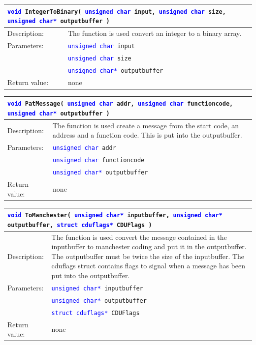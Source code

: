 \begin{table}[H]
\begin{tabular}{l p{12.5cm}}
\multicolumn{2}{p{15cm}}{\texttt{\textcolor{blue}{void} IntegerToBinary( \texttt{\textcolor{blue}{unsigned char} input, \textcolor{blue}{unsigned char} size, \textcolor{blue}{unsigned char*} outputbuffer  }) } } \\
\hline
Description:& The function is used convert an integer to a binary array.\\
Parameters:&\texttt{\textcolor{blue}{unsigned char} input}\\
&\texttt{\textcolor{blue}{unsigned char} size}\\
&\texttt{\textcolor{blue}{unsigned char*} outputbuffer}\\
Return value:&none\\
\end{tabular}
\end{table}

\begin{table}[H]
\begin{tabular}{l p{12.5cm}}
\multicolumn{2}{p{15cm}}{\texttt{\textcolor{blue}{void} PatMessage( \texttt{\textcolor{blue}{unsigned char} addr, \textcolor{blue}{unsigned char} functioncode, \textcolor{blue}{unsigned char*} outputbuffer  }) } } \\
\hline
Description:& The function is used create a message from the start code, an address and a function code. This is put into the outputbuffer.\\
Parameters:&\texttt{\textcolor{blue}{unsigned char} addr}\\
&\texttt{\textcolor{blue}{unsigned char} functioncode}\\
&\texttt{\textcolor{blue}{unsigned char*} outputbuffer}\\
Return value:&none\\
\end{tabular}
\end{table}

\begin{table}[H]
\begin{tabular}{l p{12.5cm}}
\multicolumn{2}{p{15cm}}{\texttt{\textcolor{blue}{void} ToManchester( \texttt{\textcolor{blue}{unsigned char*} inputbuffer, \textcolor{blue}{unsigned char*} outputbuffer, \textcolor{blue}{struct cduflags*} CDUFlags  }) } } \\
\hline
Description:& The function is used convert the message contained in the inputbuffer to manchester coding and put it in the outputbuffer. The outputbuffer must be twice the size of the inputbuffer. The cduflags struct contains flags to signal when a message has been put into the outputbuffer.\\
Parameters:&\texttt{\textcolor{blue}{unsigned char*} inputbuffer}\\
&\texttt{\textcolor{blue}{unsigned char*} outputbuffer}\\
&\texttt{\textcolor{blue}{struct cduflags*} CDUFlags}\\
Return value:&none\\
\end{tabular}
\end{table}

